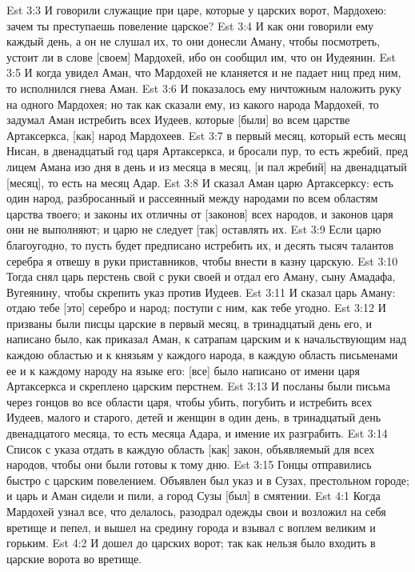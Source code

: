 Est 3:3  И говорили служащие при царе, которые у царских ворот, Мардохею: зачем ты преступаешь повеление царское?
Est 3:4  И как они говорили ему каждый день, а он не слушал их, то они донесли Аману, чтобы посмотреть, устоит ли в слове [своем] Мардохей, ибо он сообщил им, что он Иудеянин.
Est 3:5  И когда увидел Аман, что Мардохей не кланяется и не падает ниц пред ним, то исполнился гнева Аман.
Est 3:6  И показалось ему ничтожным наложить руку на одного Мардохея; но так как сказали ему, из какого народа Мардохей, то задумал Аман истребить всех Иудеев, которые [были] во всем царстве Артаксеркса, [как] народ Мардохеев.
Est 3:7  в первый месяц, который есть месяц Нисан, в двенадцатый год царя Артаксеркса, и бросали пур, то есть жребий, пред лицем Амана изо дня в день и из месяца в месяц, [и пал жребий] на двенадцатый [месяц], то есть на месяц Адар.
Est 3:8  И сказал Аман царю Артаксерксу: есть один народ, разбросанный и рассеянный между народами по всем областям царства твоего; и законы их отличны от [законов] всех народов, и законов царя они не выполняют; и царю не следует [так] оставлять их.
Est 3:9  Если царю благоугодно, то пусть будет предписано истребить их, и десять тысяч талантов серебра я отвешу в руки приставников, чтобы внести в казну царскую.
Est 3:10  Тогда снял царь перстень свой с руки своей и отдал его Аману, сыну Амадафа, Вугеянину, чтобы скрепить указ против Иудеев.
Est 3:11  И сказал царь Аману: отдаю тебе [это] серебро и народ; поступи с ним, как тебе угодно.
Est 3:12  И призваны были писцы царские в первый месяц, в тринадцатый день его, и написано было, как приказал Аман, к сатрапам царским и к начальствующим над каждою областью и к князьям у каждого народа, в каждую область письменами ее и к каждому народу на языке его: [все] было написано от имени царя Артаксеркса и скреплено царским перстнем.
Est 3:13  И посланы были письма через гонцов во все области царя, чтобы убить, погубить и истребить всех Иудеев, малого и старого, детей и женщин в один день, в тринадцатый день двенадцатого месяца, то есть месяца Адара, и имение их разграбить.
Est 3:14  Список с указа отдать в каждую область [как] закон, объявляемый для всех народов, чтобы они были готовы к тому дню.
Est 3:15  Гонцы отправились быстро с царским повелением. Объявлен был указ и в Сузах, престольном городе; и царь и Аман сидели и пили, а город Сузы [был] в смятении.
Est 4:1  Когда Мардохей узнал все, что делалось, разодрал одежды свои и возложил на себя вретище и пепел, и вышел на средину города и взывал с воплем великим и горьким.
Est 4:2  И дошел до царских ворот; так как нельзя было входить в царские ворота во вретище.
